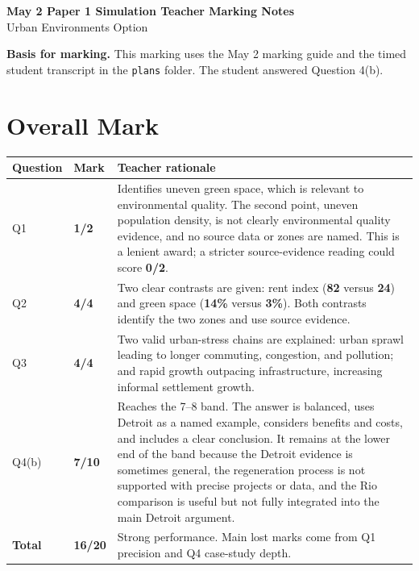 \documentclass[11pt,a4paper]{article}
\newcommand{\term}[1]{\textcolor{HeadingBlue}{\textbf{#1}}}
\newcommand{\score}[1]{\textcolor{AccentTeal}{\textbf{#1}}}
\newcommand{\boxnote}[3]{%
\noindent\colorbox{#1}{%
  \begin{minipage}{0.965\textwidth}
  \sffamily
  \textbf{\textcolor{HeadingBlue}{#2}} #3
  \end{minipage}
}}
\begin{document}
\begin{center}
  {\sffamily\bfseries\color{HeadingBlue}\LARGE May 2 Paper 1 Simulation Teacher Marking Notes}\\[0.25em]
  {\sffamily\color{AccentTeal}\large Urban Environments Option}
\end{center}

\boxnote{SoftBlue}{Basis for marking.}{This marking uses the May 2 marking
guide and the timed student transcript in the \texttt{plans} folder. The
student answered Question 4(b).}

\section{Overall Mark}

\begin{tabularx}{\textwidth}{L{0.18\textwidth}L{0.14\textwidth}Y}
\toprule
\textbf{Question} & \textbf{Mark} & \textbf{Teacher rationale} \\
\midrule
Q1 & \score{1/2} & Identifies uneven green space, which is relevant to
environmental quality. The second point, uneven population density, is not
clearly environmental quality evidence, and no source data or zones are named.
This is a lenient award; a stricter source-evidence reading could score
\score{0/2}. \\
Q2 & \score{4/4} & Two clear contrasts are given: rent index
(\term{82} versus \term{24}) and green space (\term{14\%} versus \term{3\%}).
Both contrasts identify the two zones and use source evidence. \\
Q3 & \score{4/4} & Two valid urban-stress chains are explained: urban sprawl
leading to longer commuting, congestion, and pollution; and rapid growth
outpacing infrastructure, increasing informal settlement growth. \\
Q4(b) & \score{7/10} & Reaches the 7--8 band. The answer is balanced, uses
Detroit as a named example, considers benefits and costs, and includes a clear
conclusion. It remains at the lower end of the band because the Detroit evidence
is sometimes general, the regeneration process is not supported with precise
projects or data, and the Rio comparison is useful but not fully integrated into
the main Detroit argument. \\
\midrule
\textbf{Total} & \score{16/20} & Strong performance. Main lost marks come from
Q1 precision and Q4 case-study depth. \\
\bottomrule
\end{tabularx}
\end{document}
